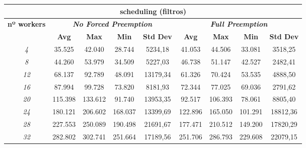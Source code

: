 \documentclass[../main.tex]{subfiles}
\begin{document}
\begin{table}[htp]
\begin{tabular}{|c|c|c|c|c|c|c|c|c|}
\hline
\multicolumn{9}{|c|}{\textbf{scheduling (filtros)}}                                                                                                                     \\ \hline
\multirow{2}{*}{\textbf{nº workers}} & \multicolumn{4}{c|}{\textit{\textbf{No Forced Preemption}}}   & \multicolumn{4}{c|}{\textit{\textbf{Full Preemption}}}        \\ \cline{2-9} 
                                     & \textbf{Avg} & \textbf{Max} & \textbf{Min} & \textbf{Std Dev} & \textbf{Avg} & \textbf{Max} & \textbf{Min} & \textbf{Std Dev} \\ \hline
\textit{4}                           & 35.525       & 42.040       & 28.744       & 5234,18          & 41.053       & 44.506       & 33.081       & 3518,25          \\ \hline
\textit{8}                           & 44.260       & 53.979       & 34.509       & 5227,03          & 46.738       & 51.147       & 42.527       & 2482,41          \\ \hline
\textit{12}                          & 68.137       & 92.789       & 48.091       & 13179,34         & 61.326       & 70.424       & 53.535       & 4888,50          \\ \hline
\textit{16}                          & 87.994       & 99.728       & 73.820       & 8181,93          & 72.344       & 77.025       & 69.036       & 2791,62          \\ \hline
\textit{20}                          & 115.398      & 133.612      & 91.740       & 13953,35         & 92.517       & 106.393      & 78.061       & 8805,40          \\ \hline
\textit{24}                          & 180.121      & 206.602      & 168.037      & 13399,69         & 122.896      & 165.050      & 101.291      & 18812,36         \\ \hline
\textit{28}                          & 227.553      & 250.089      & 190.498      & 21691,67         & 177.471      & 210.512      & 149.200      & 17820,29         \\ \hline
\textit{32}                          & 282.802      & 302.741      & 251.664      & 17189,56         & 251.706      & 286.793      & 229.608      & 22079,15         \\ \hline

\end{tabular}
\end{table}
\end{document}
